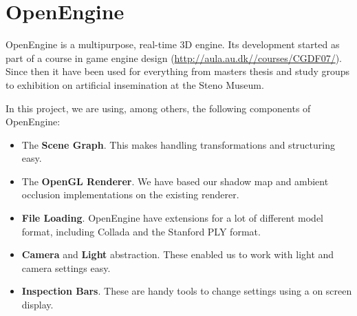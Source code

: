 \section{OpenEngine}

OpenEngine is a multipurpose, real-time 3D engine. Its development
started as part of a course in game engine design
(\url{http://aula.au.dk//courses/CGDF07/}). Since then it have been
used for everything from masters thesis and study groups to exhibition
on artificial insemination at the Steno Museum.

In this project, we are using, among others, the following components
of OpenEngine:

\begin{itemize}
\item The \textbf{Scene Graph}. This makes handling transformations
  and structuring easy.
\item The \textbf{OpenGL Renderer}. We have based our shadow map and
  ambient occlusion implementations on the existing renderer.
\item \textbf{File Loading}. OpenEngine have extensions for a lot of
  different model format, including Collada and the Stanford PLY format.
\item \textbf{Camera} and \textbf{Light} abstraction. These enabled us
  to work with light and camera settings easy.
\item \textbf{Inspection Bars}. These are handy tools to change
  settings using a on screen display.
\end{itemize}


